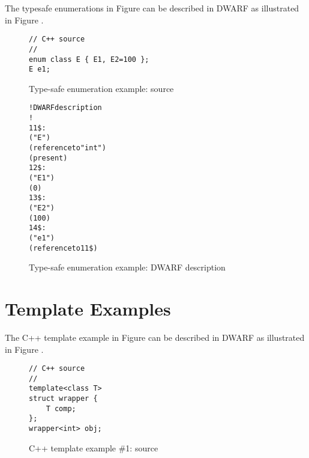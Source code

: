 The  type\dash safe enumerations in
Figure 
can be described in DWARF as illustrated in 
Figure .

\begin{figure}[H]
\begin{lstlisting}[numbers=none]
// C++ source
//
enum class E { E1, E2=100 };
E e1;
\end{lstlisting}
\caption{Type-safe enumeration example: source}
\label{fig:ctypesafeenumerationexamplesource}
\end{figure}

\begin{figure}[H]
\begin{dwflisting}
\begin{alltt}
! DWARF description
!
11\$: 
        ("E")
        (reference to "int")
        (present)
12\$:   
            ("E1")
            (0)
13\$:
            ("E2")
            (100)
14\$: 
        ("e1")
        (reference to 11\$)
\end{alltt}
\end{dwflisting}
\caption{Type-safe enumeration example: DWARF description}
\label{fig:ctypesafeenumerationexampledwarf}
\end{figure}


\clearpage
\section{Template Examples}
\label{app:templateexample}

The C++ template example in
Figure 
can be described in DWARF as illustrated in 
Figure .

\begin{figure}[h]
\begin{lstlisting}
// C++ source
//
template<class T>
struct wrapper {
    T comp;
};
wrapper<int> obj;
\end{lstlisting}
\caption{C++ template example \#1: source}
\label{fig:ctemplateexample1source}
\end{figure}

